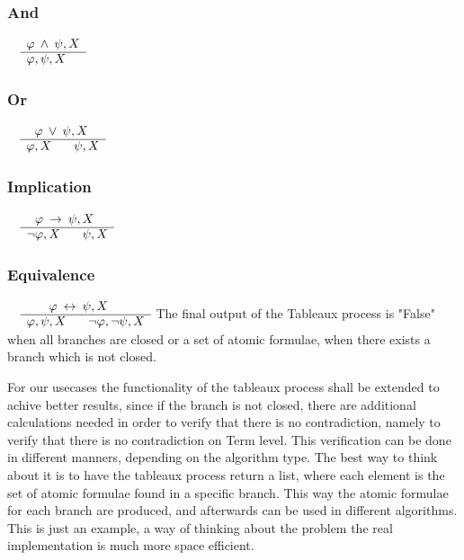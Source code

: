 \documentclass{article}
\begin{document}
		\subsubsection*{And}
			$\begin{array}{rl}
				& \varphi \: \wedge \: \psi, X \\
			      \cline{2-2}
			      & \varphi, \psi, X
			\end{array}$

		\subsubsection*{Or}
			$\begin{array}{rl}
				& \:\:\: \varphi \: \vee \: \psi, X \\
			      \cline{2-2}
			      & \varphi, X \:\:\:\:\:\:\:\: \psi, X
			\end{array}$

		\subsubsection*{Implication}
			$\begin{array}{rl}
				& \:\:\: \varphi \: \rightarrow \: \psi, X \\
			      \cline{2-2}
			      & \neg\varphi, X \:\:\:\:\:\:\:\: \psi, X
			\end{array}$

		\subsubsection*{Equivalence}
			$\begin{array}{rl}
				& \:\:\:\:\:\:\:\: \varphi \: \leftrightarrow \: \psi, X \\
			      \cline{2-2}
			      & \varphi, \psi, X \:\:\:\:\:\:\:\: \neg\varphi, \neg \psi, X
			\end{array}$
	\newline
	\newline
	\newline
	The final output of the Tableaux process is "False" when all branches are closed or a set of atomic formulae, when there exists a branch which is not closed.
	\newline

	For our usecases the functionality of the tableaux process shall be extended to achive better results, since if the branch is not closed, there are 
	additional calculations needed in order to verify that there is no contradiction, namely to verify that there is no contradiction on Term level.
	This verification can be done in different manners, depending on the algorithm type. The best way to think about it is to have the tableaux process
	return a list, where each element is the set of atomic formulae found in a specific branch. This way the atomic formulae for each branch are produced, and 
	afterwards can be used in different algorithms. This is just an example, a way of thinking about the problem the real implementation is much more space 
	efficient.
\end{document}
